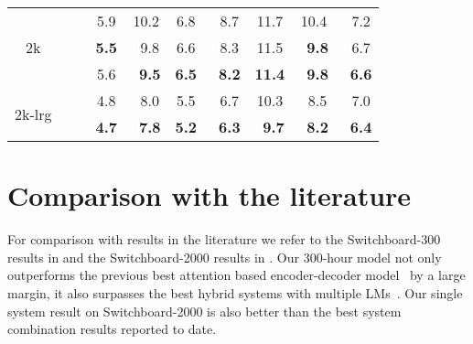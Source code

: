 \documentclass[a4paper]{article}
\begin{document}
\begin{table}
\begin{tabular}{|@{}c@{}||@{}c@{}|@{}c@{}||@{}c@{}|@{}c@{}||@{}c@{}|@{}c@{}|@{}c@{}||@{}c@{}|@{}c@{}|}
\hline       
\hline       
\multirow{3}{*}{\hspace{1mm}2k\hspace{1mm}}
         &                      &          & 5.9  &  10.2 &  \textcolor{white}{}6.8  &   \textcolor{white}{0}8.7  &  11.7  & 10.4                      & \textcolor{white}{0}7.2    \\ \cline{2-10}
         &              &          & \bf{5.5}  & \textcolor{white}{0}9.8 &  \textcolor{white}{}6.6  &   \textcolor{white}{0}8.3  &  11.5  & \textcolor{white}{0}\bf{9.8}   & \textcolor{white}{0}6.7    \\ \cline{2-10}
         &              &  & 5.6  & \textcolor{white}{0}\bf{9.5} &  \textcolor{white}{}\bf{6.5}  & \textcolor{white}{0}\bf{8.2}  &  \bf{11.4}  & \textcolor{white}{0}\bf{9.8}   & \textcolor{white}{0}\bf{6.6}    \\ 
\hline
\hline
\multirow{2}{*}{\hspace{.4mm}2k-lrg\hspace{.4mm}}
         &                          &              &     4.8  & \textcolor{white}{0}{8.0} &  \textcolor{white}{}{5.5}  & \textcolor{white}{0}{6.7}  &  {10.3}  & \textcolor{white}{0}{8.5}   & \textcolor{white}{0}{7.0}    \\ \cline{2-10}           
         &              &  & \bf{4.7} & \textcolor{white}{0}\bf{7.8} &  \textcolor{white}{}\bf{5.2}  & \textcolor{white}{0}\bf{6.3}  & \textcolor{white}{0}\bf{9.7}  & \textcolor{white}{0}\bf{8.2}   & \textcolor{white}{0}\bf{6.4}    \\ 
\hline
\end{tabular}
\label{tab:overall}
\vspace{-3mm}
\end{table}


\vspace{-.5mm}
\section{Comparison with the literature}
\vspace{-1mm}
For comparison with results in the literature we refer to the Switchboard-300 results in \cite{Park2019,Irie2019asru,Hadian2018,Audhkhasi2019} and the \mbox{Switchboard-2000} results in \cite{Xiong2018,Hadian2018,Saon2017,Battenberg2017,Kurata2017,Nguyen2019,capio}.
Our 300-hour model not only outperforms the previous best attention based encoder-decoder model~\cite{Park2019} by a large margin, it also surpasses the best hybrid systems with multiple LMs~\cite{Irie2019asru}.
Our single system result on Switchboard-2000 is also better than the best system combination results reported to date.
\end{document}
